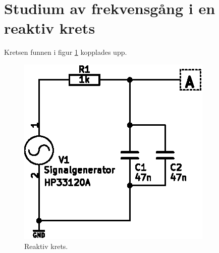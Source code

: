 \documentclass[11pt,a4paper]{article}
\begin{document}
\section{Studium av frekvensgång i en reaktiv krets}\label{}
Kretsen funnen i figur \ref{fig:8-schem} kopplades upp.
\begin{figure}[htbp]
    \centering
        \includegraphics[scale=1.0]{img/8-schem.eps}
    \caption{Reaktiv krets.}
    \label{fig:8-schem}
\end{figure}
\end{document}
